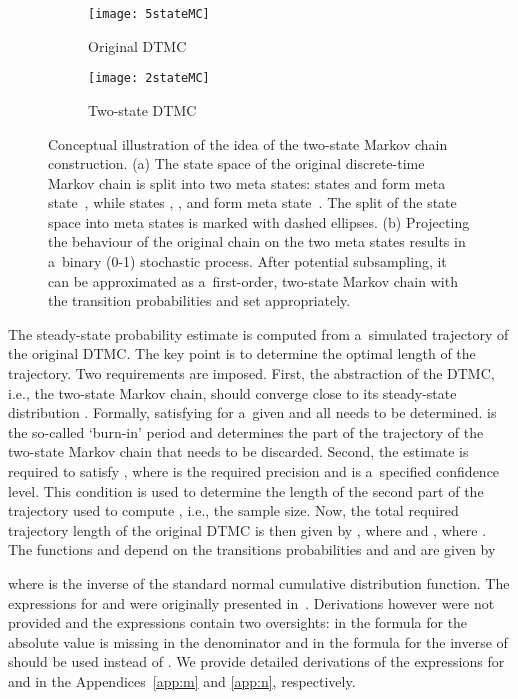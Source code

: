 \documentclass[runningheads,a4paper]{llncs}
\begin{document}
\begin{figure}[t]
  \centering
  \begin{subfigure}[b]{0.48\textwidth}
    \texttt{[image: 5stateMC]}
    \caption{Original DTMC}
    \label{fig:dtmc}
  \end{subfigure}\quad
  \begin{subfigure}[b]{0.48\textwidth}
    \texttt{[image: 2stateMC]}
    \vspace{5mm}
    \caption{Two-state DTMC }
    \label{fig:two-state_MC}
  \end{subfigure}
  \caption{Conceptual illustration of the idea of the two-state Markov chain construction. (a) The
  state space of the original discrete-time Markov chain is split into two meta states: states
   and  form meta state~, while states , , and  form meta state~. The split
  of the state space into meta states is marked with dashed ellipses. (b) Projecting the behaviour
  of the original chain on the two meta states results in a~binary (0-1) stochastic process. After
  potential subsampling, it can be approximated as a~first-order, two-state Markov chain with the
  transition probabilities  and  set appropriately.}
  \label{fig:two-state_MC_approach}
\end{figure}



The steady-state probability estimate  is computed from a~simulated trajectory of the
original DTMC. The key point is to determine the optimal length of the trajectory. Two
requirements are imposed. First, the abstraction of the DTMC, i.e., the two-state Markov chain,
should converge close to its steady-state distribution . Formally, 
satisfying  for a~given  and
all  needs to be determined.  is the so-called `burn-in' period and determines
the part of the trajectory of the two-state Markov chain that needs to be discarded. Second, the
estimate  is required to satisfy , where  is the required precision and  is a~specified confidence level. This condition is
used to determine the length of the second part of the trajectory used to compute , i.e.,
the sample size. Now, the total required trajectory length of the original DTMC is then given by
, where  and , where . The functions  and  depend on the transitions probabilities 
and  and are given by

where  is the inverse of the standard normal cumulative distribution function.
The expressions for  and  were originally presented in~\cite{RL92}. Derivations however were
not provided and the expressions contain two oversights: in the formula for  the absolute value
is missing in the denominator and in the formula for  the inverse of  should be
used instead of . We provide detailed derivations of the expressions for  and
 in the Appendices~\ref{app:m} and \ref{app:n}, respectively.
\end{document}
